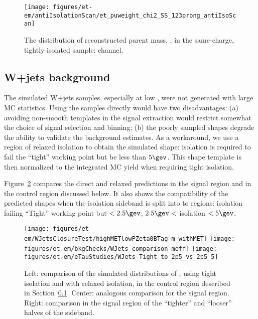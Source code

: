 \begin{figure}\centering
  \texttt{[image: figures/et-em/antiIsolationScan/et\_puweight\_chi2\_SS\_123prong\_antiIsoScan]} %
  \caption{\label{fig:et_sst} The distribution of reconstructed parent
    mass, \meffetau, in the same-charge, tightly-isolated sample:
    \teth channel.}
\end{figure}

\subsection{W+jets background}
\label{sec:et_w_bkg_validation}

The simulated W+jets samples, especially at low \HT, were not
generated with large MC statistics.  Using the samples directly would
have two disadvantages: (a) avoiding non-smooth templates in the
signal extraction would restrict somewhat the choice of signal
selection and binning; (b) the poorly sampled shapes degrade the
ability to validate the background estimates.  As a workaround, we use
a region of relaxed \tauh isolation to obtain the simulated shape:
\tauh isolation is required to fail the ``tight'' working point but be
less than $5\gev$.  This shape template is then normalized to the
integrated MC yield when requiring tight \tauh isolation.

Figure~\ref{fig:et-w-shape} compares the direct and relaxed
predictions in the signal region and in the control region discussed
below.  It also shows the compatibility of the predicted shapes when
the isolation sideband is split into to regions: \tauh isolation
failing ``Tight'' working point but $<2.5\gev$; $2.5\gev<$ \tauh
isolation $<5\gev$.

\begin{figure}\centering
  \texttt{[image: figures/et-em/WJetsClosureTest/highMETlowPZeta0BTag\_m\_withMET]}
  \texttt{[image: figures/et-em/bkgChecks/WJets\_comparison\_meff]}
  \texttt{[image: figures/et-em/eTauStudies/WJets\_Tight\_to\_2p5\_vs\_2p5\_5]}
  \caption{\label{fig:et-w-shape} Left: comparison of the simulated
    distributions of \meffetau, using tight \tauh isolation and with
    relaxed \tauh isolation, in the control region described in
    Section~\ref{sec:et_w_bkg_validation}.  Center: analogous
    comparison for the signal region.  Right: comparison in the signal
    region of the ``tighter'' and ``looser'' halves of the sideband.}
\end{figure}


